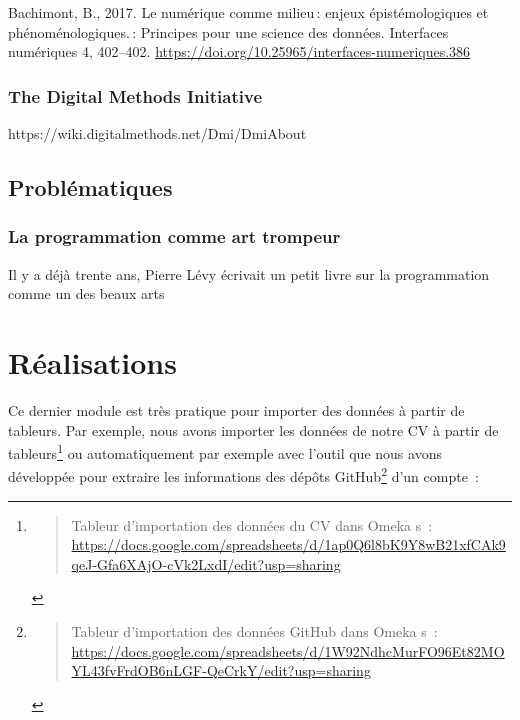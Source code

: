 \documentclass[
  a4paper,
  DIV=11,
  numbers=noendperiod]{scrreprt}
\begin{document}
Bachimont, B., 2017. Le numérique comme milieu\,: enjeux
épistémologiques et phénoménologiques.\,: Principes pour une science des
données. Interfaces numériques 4, 402--402.
\url{https://doi.org/10.25965/interfaces-numeriques.386}

\subsection{The Digital Methods
Initiative}\label{the-digital-methods-initiative}

https://wiki.digitalmethods.net/Dmi/DmiAbout

\section{Problématiques}\label{probluxe9matiques}

\subsection{La programmation comme art
trompeur}\label{la-programmation-comme-art-trompeur}

Il y a déjà trente ans, Pierre Lévy écrivait un petit livre sur la
programmation comme un des beaux arts

\chapter{Réalisations}\label{sec-realisations}

Ce dernier module est très pratique pour importer des données à partir
de tableurs. Par exemple, nous avons importer les données de notre CV à
partir de tableurs\footnote{\begin{quote}
  Tableur d'importation des données du CV dans Omeka s~:
  \url{https://docs.google.com/spreadsheets/d/1ap0Q6l8bK9Y8wB21xfCAk9qeJ-Gfa6XAjO-cVk2LxdI/edit?usp=sharing}
  \end{quote}} ou automatiquement par exemple avec l'outil que nous
avons développée pour extraire les informations des dépôts
GitHub\footnote{\begin{quote}
  Tableur d'importation des données GitHub dans Omeka s~:
  \url{https://docs.google.com/spreadsheets/d/1W92NdhcMurFO96Et82MOYL43fvFrdOB6nLGF-QeCrkY/edit?usp=sharing}
  \end{quote}} d'un compte~:
\end{document}
